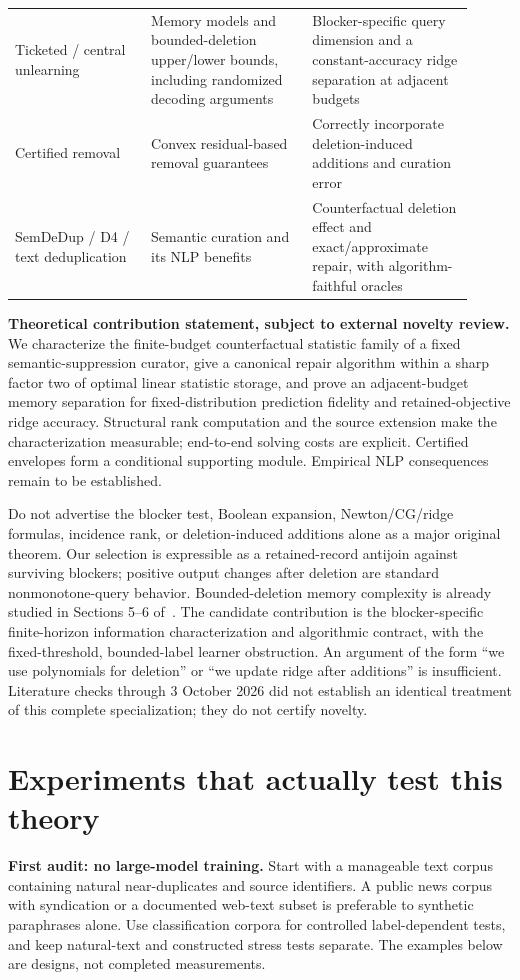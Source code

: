 \documentclass[11pt,a4paper]{article}
\theoremstyle{definition}\newtheorem{definition}[theorem]{Definition}
\begin{document}
\begin{longtable}{p{0.27\linewidth}p{0.32\linewidth}p{0.32\linewidth}}
Ticketed / central unlearning~\cite{ghazi2023,cherapanamjeri2025} & Memory models and bounded-deletion upper/lower bounds, including randomized decoding arguments & Blocker-specific query dimension and a constant-accuracy ridge separation at adjacent budgets\\[4pt]
Certified removal~\cite{guo2020} & Convex residual-based removal guarantees & Correctly incorporate deletion-induced additions and curation error\\[4pt]
SemDeDup / D4 / text deduplication~\cite{semdedup,d4,lee2022} & Semantic curation and its NLP benefits & Counterfactual deletion effect and exact/approximate repair, with algorithm-faithful oracles\\
\bottomrule
\end{longtable}

\textbf{Theoretical contribution statement, subject to external novelty review.} We characterize the finite-budget counterfactual statistic family of a fixed semantic-suppression curator, give a canonical repair algorithm within a sharp factor two of optimal linear statistic storage, and prove an adjacent-budget memory separation for fixed-distribution prediction fidelity and retained-objective ridge accuracy. Structural rank computation and the source extension make the characterization measurable; end-to-end solving costs are explicit. Certified envelopes form a conditional supporting module. Empirical NLP consequences remain to be established.

Do not advertise the blocker test, Boolean expansion, Newton/CG/ridge formulas, incidence rank, or deletion-induced additions alone as a major original theorem. Our selection is expressible as a retained-record antijoin against surviving blockers; positive output changes after deletion are standard nonmonotone-query behavior. Bounded-deletion memory complexity is already studied in Sections 5--6 of~\cite{cherapanamjeri2025}. The candidate contribution is the blocker-specific finite-horizon information characterization and algorithmic contract, with the fixed-threshold, bounded-label learner obstruction. An argument of the form ``we use polynomials for deletion'' or ``we update ridge after additions'' is insufficient. Literature checks through 3 October 2026 did not establish an identical treatment of this complete specialization; they do not certify novelty.

\section{Experiments that actually test this theory}
\textbf{First audit: no large-model training.} Start with a manageable text corpus containing natural near-duplicates and source identifiers. A public news corpus with syndication or a documented web-text subset is preferable to synthetic paraphrases alone. Use classification corpora for controlled label-dependent tests, and keep natural-text and constructed stress tests separate. The examples below are designs, not completed measurements.
\end{document}
